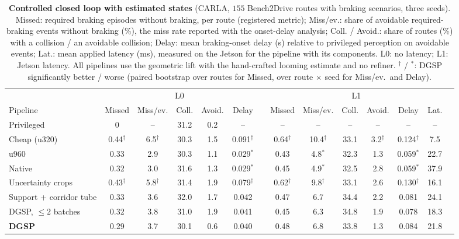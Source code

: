 \documentclass[10pt,letterpaper]{article}
\newcommand{\method}{DGSP\xspace}
\newcommand{\oursrow}{\rowcolor{oursbg}}
\newcommand{\na}{--}
\theoremstyle{remark}
\theoremstyle{plain}
\theoremstyle{definition}
\begin{document}
\begin{table}[!tbp]
\centering
\caption{\textbf{Controlled closed loop with estimated states} (CARLA, $155$ Bench2Drive routes with braking scenarios, three seeds). Missed: required braking episodes without braking, per route (registered metric); Miss/ev.: share of avoidable required-braking events without braking (\%), the miss rate reported with the onset-delay analysis; Coll. / Avoid.: share of routes (\%) with a collision / an avoidable collision; Delay: mean braking-onset delay (s) relative to privileged perception on avoidable events; Lat.: mean applied latency (ms), measured on the Jetson for the pipeline with its components. L0: no latency; L1: Jetson latency. All pipelines use the geometric lift with the hand-crafted looming estimate and no refiner. $^{\dagger}$ / $^{\ast}$: \method significantly better / worse (paired bootstrap over routes for Missed, over route $\times$ seed for Miss/ev.\ and Delay).}
\label{tab:aeb}
\footnotesize
\setlength{\tabcolsep}{2.4pt}
\begin{tabular}{@{}lccccccccccccc@{}}
\toprule
 & \multicolumn{5}{c}{L0} & & \multicolumn{6}{c}{L1} \\
\cmidrule(lr){2-6}\cmidrule(l){8-13}
Pipeline & Missed & Miss/ev. & Coll. & Avoid. & Delay & & Missed & Miss/ev. & Coll. & Avoid. & Delay & Lat. \\
\midrule
Privileged & 0 & \na & 31.2 & 0.2 & \na & & \na & \na & \na & \na & \na & \na \\
Cheap (u320) & 0.44$^{\dagger}$ & 6.5$^{\dagger}$ & 30.3 & 1.5 & 0.091$^{\dagger}$ & & 0.64$^{\dagger}$ & 10.4$^{\dagger}$ & 33.1 & 3.2$^{\dagger}$ & 0.124$^{\dagger}$ & 7.5 \\
u960 & 0.33 & 2.9 & 30.3 & 1.1 & 0.029$^{\ast}$ & & 0.43 & 4.8$^{\ast}$ & 32.3 & 1.3 & 0.059$^{\ast}$ & 22.7 \\
Native & 0.32 & 3.0 & 31.6 & 1.3 & 0.029$^{\ast}$ & & 0.45 & 4.9$^{\ast}$ & 32.5 & 2.8 & 0.059$^{\ast}$ & 37.9 \\
Uncertainty crops & 0.43$^{\dagger}$ & 5.8$^{\dagger}$ & 31.4 & 1.9 & 0.079$^{\dagger}$ & & 0.62$^{\dagger}$ & 9.8$^{\dagger}$ & 33.1 & 2.6 & 0.130$^{\dagger}$ & 16.1 \\
Support + corridor tube & 0.33 & 3.6 & 32.0 & 1.7 & 0.042 & & 0.47 & 6.7 & 34.4 & 2.2 & 0.081 & 24.1 \\
\method, $\le2$ batches & 0.32 & 3.8 & 31.0 & 1.9 & 0.041 & & 0.45 & 6.3 & 34.8 & 1.9 & 0.078 & 18.3 \\
\midrule
\oursrow \textbf{\method} & 0.29 & 3.7 & 30.1 & 0.6 & 0.040 & & 0.48 & 6.8 & 33.8 & 1.3 & 0.084 & 21.8 \\
\bottomrule
\end{tabular}
\end{table}
\end{document}
